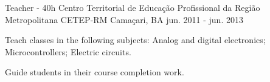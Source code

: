 \begin{cventries}

  \cventry
    {Teacher - 40h} %
    {Centro Territorial de Educação Profissional da Região Metropolitana CETEP-RM} %
    {Camaçari, BA} %
    {jun. 2011 - jun. 2013} %
    {
      \begin{cvitems} %
        \item {Teach classes in the following subjects: Analog and digital electronics; Microcontrollers; Electric circuits.}
        \item {Guide students in their course completion work.}
      \end{cvitems}
    }
    
    



\end{cventries}
